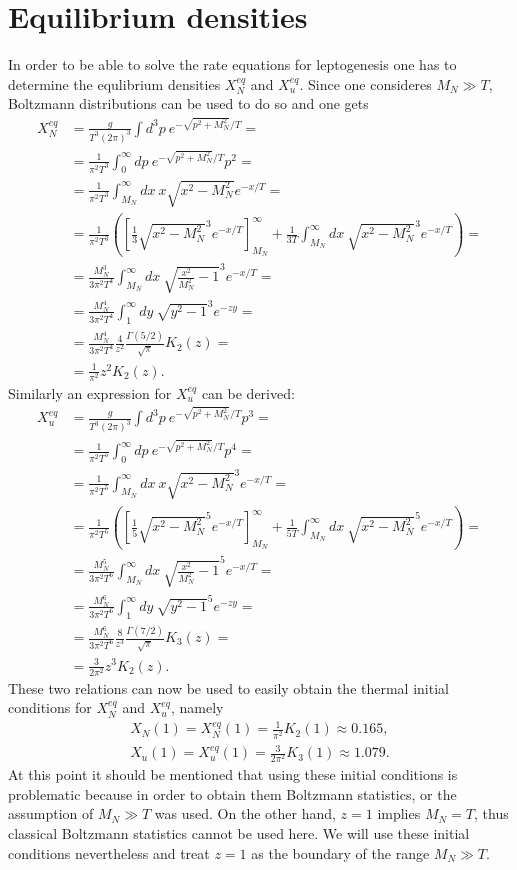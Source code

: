 \section{Equilibrium densities}
\label{ap:equlibrium}
In order to be able to solve the rate equations for leptogenesis one has to determine the equlibrium densities $X_N^{eq}$ and $X_u^{eq}$. Since one consideres $M_N\gg T$, Boltzmann distributions can be used to do so and one gets
\begin{align*}
	X_N^{eq}&=\frac{g}{T^3(2\pi)^3}\int d^3p \:e^{-\sqrt{p^2+M_N^2}/T}=\\
	&=\frac{1}{\pi^2T^3}\int_0^\infty dp \:e^{-\sqrt{p^2+M_N^2}/T}p^2=\\
	&=\frac{1}{\pi^2T^3}\int_{M_N}^\infty dx \:x\sqrt{x^2-M_N^2}e^{-x/T}=\\
	&=\frac{1}{\pi^2T^3}\left(\left[\frac{1}{3}\sqrt{x^2-M_N^2}^3e^{-x/T}\right]_{M_N}^\infty+\frac{1}{3T}\int_{M_N}^{\infty}dx\:\sqrt{x^2-M_N^2}^3e^{-x/T}\right)=\\
	&=\frac{M_N^3}{3\pi^2T^4}\int_{M_N}^{\infty}dx\:\sqrt{\frac{x^2}{M_N^2}-1}^3e^{-x/T}=\\
	&=\frac{M_N^4}{3\pi^2T^4}\int_{1}^{\infty}dy\:\sqrt{y^2-1}^3e^{-zy}=\\
	&=\frac{M_N^4}{3\pi^2T^4}\frac{4}{z^2}\frac{\Gamma(5/2)}{\sqrt{\pi}}K_2(z)=\\
	&=\frac{1}{\pi^2}z^2K_2(z).
\end{align*}
Similarly an expression for $X_u^{eq}$ can be derived:
\begin{align*}
X_u^{eq}&=\frac{g}{T^3(2\pi)^3}\int d^3p \:e^{-\sqrt{p^2+M_N^2}/T}p^3=\\
&=\frac{1}{\pi^2T^5}\int_0^\infty dp \:e^{-\sqrt{p^2+M_N^2}/T}p^4=\\
&=\frac{1}{\pi^2T^5}\int_{M_N}^\infty dx \:x\sqrt{x^2-M_N^2}^3e^{-x/T}=\\
&=\frac{1}{\pi^2T^5}\left(\left[\frac{1}{5}\sqrt{x^2-M_N^2}^5e^{-x/T}\right]_{M_N}^\infty+\frac{1}{5T}\int_{M_N}^{\infty}dx\:\sqrt{x^2-M_N^2}^5e^{-x/T}\right)=\\
&=\frac{M_N^5}{3\pi^2T^6}\int_{M_N}^{\infty}dx\:\sqrt{\frac{x^2}{M_N^2}-1}^5e^{-x/T}=\\
&=\frac{M_N^6}{3\pi^2T^6}\int_{1}^{\infty}dy\:\sqrt{y^2-1}^5e^{-zy}=\\
&=\frac{M_N^6}{3\pi^2T^6}\frac{8}{z^3}\frac{\Gamma(7/2)}{\sqrt{\pi}}K_3(z)=\\
&=\frac{3}{2\pi^2}z^3K_2(z).
\end{align*}
These two relations can now be used to easily obtain the thermal initial conditions for $X_N^{eq}$ and $X_u^{eq}$, namely
\begin{align*}
	X_N(1)=X_N^{eq}(1)=\frac{1}{\pi^2}K_2(1)\approx 0.165,\\
	X_u(1)=X_u^{eq}(1)=\frac{3}{2\pi^2}K_3(1)\approx 1.079.
\end{align*}
At this point it should be mentioned that using these initial conditions is problematic because in order to obtain them Boltzmann statistics, or the assumption of $M_N\gg T$ was used. On the other hand, $z=1$ implies $M_N=T$, thus classical Boltzmann statistics cannot be used here. We will use these initial conditions nevertheless and treat $z=1$ as the boundary of the range $M_N\gg T$.
